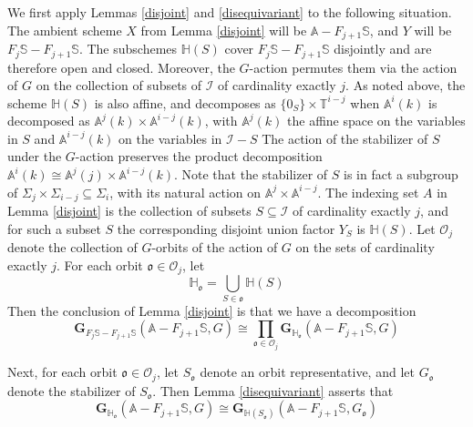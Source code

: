 \documentclass[11pt]{article}
\newcommand\mb{\mathbb}
\newcommand\mc{\mathcal}
\newcommand\mfk{\mathbf G}
\begin{document}
We first apply Lemmas \ref{disjoint} and \ref{disequivariant} to the following situation.  The ambient scheme $X$ from Lemma \ref{disjoint} will be $\mb{A} - F_{j+1}\mb{S}$, and $Y$ will be $F_j \mb{S}- F_{j+1} \mb{S}$.  The subschemes $\mb{H}(S)$  cover $F_j \mb{S}- F_{j+1} \mb{S}$ disjointly and are therefore open and closed.   Moreover, the $G$-action permutes them via the action of $G$  on the collection of subsets of $\mathcal{I}$ of cardinality exactly  $j$. As noted above, the scheme $\mb{H}(S) $ is also affine, and decomposes as $\{ 0_S \} \times \mb{T}^{i-j}$ when $\mb{A}^i(k) $ is decomposed as $\mb{A}^j(k) \times \mb{A}^{i-j}(k)$, with $\mb{A}^j(k) $ the affine space on the variables in $S$ and $\mb{A}^{i-j}(k) $ on the variables  in $\mc{I}-S$ 
The action of the stabilizer of $S$ under the $G$-action preserves the  product decomposition $\mb{A}^i(k) \cong \mb{A}^j (j) \times \mb{A}^{i-j}(k)$.   Note that the stabilizer of $S$ is in fact a subgroup of $\Sigma _j\times  \Sigma _{i-j } \subseteq \Sigma _i $, with its natural action on $\mb{A}^{j} \times \mb{A}^{i-j}$.  The indexing set $A$  in Lemma \ref{disjoint} is the collection of subsets $S \subseteq \mc{I}$ of cardinality exactly $j$, and for such a subset $S$ the corresponding disjoint union factor $Y_S$ is  $ \mb{H}(S)$.  Let $\mc{O}_j$ denote the collection of $G$-orbits of the action of $G$ on the sets of cardinality exactly $j$. For each orbit $\mathfrak{o} \in \mc{O}_j$, let $$\mb{H}_{\mathfrak{o}} = \bigcup _{S \in \mathfrak{o}} \mb{H}(S)$$  Then the   conclusion of Lemma \ref{disjoint} is that we have a decomposition
\begin{equation} \label{initdecomp} \mfk_{F_{j}\mb{S}- F_{j+1} \mb{S}}(\mb{A}- F_{j+1}\mb{S}, G) \cong \prod _{\mathfrak{o} \in \mc{O}_j}\mfk_{\mb{H}_{\mathfrak{o}}}(\mb{A}- F_{j+1} \mb{S}, G)
\end{equation}

Next, for each orbit $\mathfrak{o} \in \mc{O}_j$, let $S_{\mathfrak{o}}$ denote an orbit representative, and let $G_{\mathfrak{o}}$ denote the stabilizer of $S_{\mathfrak{o}}$.  Then Lemma \ref{disequivariant} asserts that 
\begin{equation} \label{seconddecomp} \mfk_{\mb{H}_{\mathfrak{o}}}(\mb{A}- F_{j+1} \mb{S}, G) \cong \mfk_{\mb{H}(S_\mathfrak{o})}(\mb{A}- F_{j+1} \mb{S}, G_{\mathfrak{o}})
\end{equation}
\end{document}
